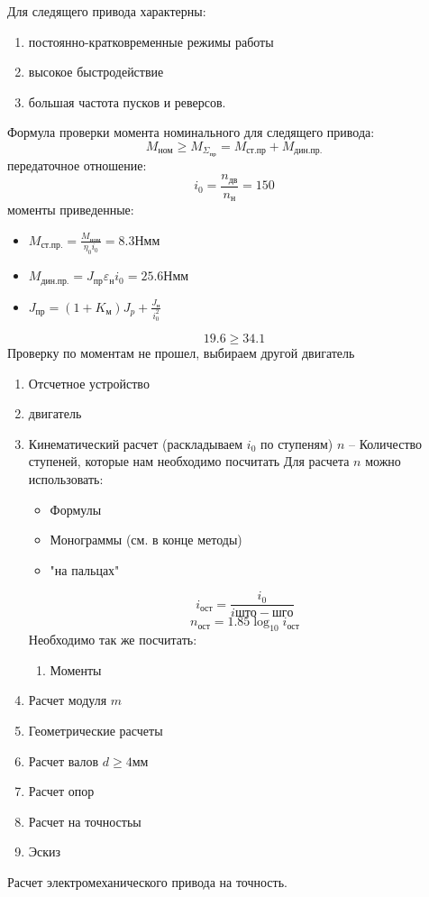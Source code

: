 \documentclass{article}
\begin{document}
Для следящего привода характерны:
\begin{enumerate}
	\item постоянно-кратковременные режимы работы
	\item высокое быстродействие
	\item большая частота пусков и реверсов.
\end{enumerate}

Формула проверки момента номинального для следящего привода:
$$
M_{ном} \ge M_{\Sigma_{пр}} = M_{ст.пр} + M_{дин. пр.}
$$
передаточное отношение:
$$
i_0 = \frac{n_{дв}}{n_н} = 150
$$
моменты приведенные:
\begin{itemize}
	\item $M_{ст.пр.} = \frac{M_{ном}}{\eta_0 i_0} = 8.3 Н мм$
	\item $M_{дин.пр.} = J_{пр} \varepsilon_н i_0 = 25.6 Н мм$
	\item $J_{пр} = (1 + K_м) J_p + \frac{J_н}{i_0^2}$
\end{itemize}
$$
19.6 \ge 34.1
$$
Проверку по моментам не прошел, выбираем другой двигатель

\begin{enumerate}
	\item Отсчетное устройство
	\item двигатель
	\item Кинематический расчет (раскладываем $i_0$ по ступеням) $n$ -- Количество ступеней, которые нам необходимо посчитать
	Для расчета $n$ можно использовать:
	\begin{itemize}
		\item Формулы
		\item Монограммы (см. в конце методы)
		\item "на пальцах"
	\end{itemize}
	$$
	i_{ост} = \frac{i_0}{i{што-шго}} 
	$$
	$$
	n_{ост} = 1.85 \log_{10}{ i_{ост}}
	$$
	Необходимо так же посчитать:
	\begin{enumerate}
		\item Моменты
	\end{enumerate}
	\item Расчет модуля $m$
	\item Геометрические расчеты
	\item Расчет валов $d \ge 4 мм$
	\item Расчет опор
	\item Расчет на точностьы
	\item Эскиз
\end{enumerate}
Расчет электромеханического привода на точность.
\end{document}
